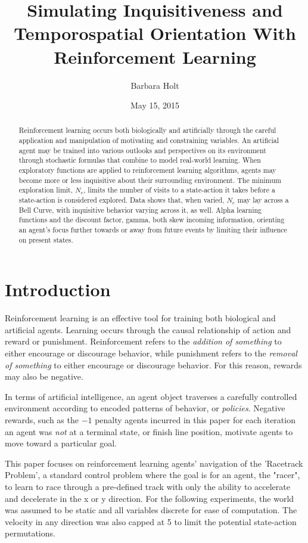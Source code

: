 \documentclass[12pt, letter]{article}
\title{Simulating Inquisitiveness and Temporospatial Orientation With Reinforcement Learning}
\author{Barbara Holt}
\date{May 15, 2015}
\begin{document}
\maketitle

\begin{abstract}
    Reinforcement learning occurs both biologically and artificially through the careful application and manipulation of motivating and constraining variables.  An artificial agent may be trained into various outlooks and perspectives on its environment through stochastic formulas that combine to model real-world learning.  When exploratory functions are applied to reinforcement learning algorithms, agents may become more or less inquisitive about their surrounding environment.  The minimum exploration limit, $N_e$, limits the number of visits to a state-action it takes before a state-action is considered explored.  Data shows that, when varied, $N_e$ may lay across a Bell Curve, with inquisitive behavior varying across it, as well.  Alpha learning functions and the discount factor, gamma, both skew incoming information, orienting an agent's focus further towards or away from future events by limiting their influence on present states.
\end{abstract}

\newpage
\section{Introduction}
Reinforcement learning is an effective tool for training both biological and artificial agents.  Learning occurs through the causal relationship of action and reward or punishment.  Reinforcement refers to the \emph{addition of something} to either encourage or discourage behavior, while punishment refers to the \emph{removal of something} to either encourage or discourage behavior.  For this reason, rewards may also be negative.  

In terms of artificial intelligence, an agent object traverses a carefully controlled environment according to encoded patterns of behavior, or \emph{policies}.  Negative rewards, such as the $-1$ penalty agents incurred in this paper for each iteration an agent was \emph{not} at a terminal state, or finish line position, motivate agents to move toward a particular goal.

This paper focuses on reinforcement learning agents' navigation of the 'Racetrack Problem', a standard control problem where the goal is for an agent, the "racer", to learn to race through a pre-defined track with only the ability to accelerate and decelerate in the x or y direction.  For the following experiments, the world was assumed to be static and all variables discrete for ease of computation.  The velocity in any direction was also capped at 5 to limit the potential state-action permutations.\cite{final}
\end{document}
